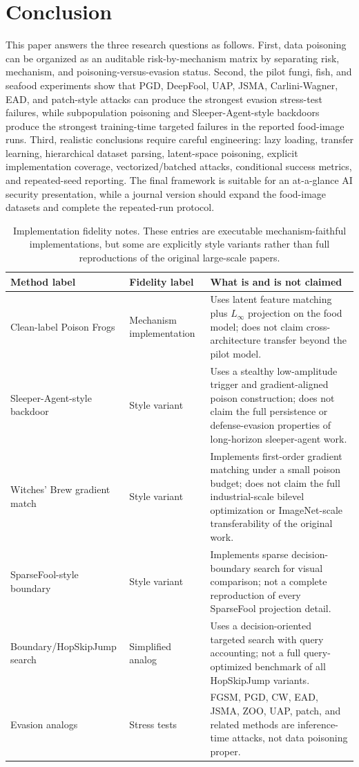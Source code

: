 \documentclass[conference]{IEEEtran}
\begin{document}
\section{Conclusion}

This paper answers the three research questions as follows. First, data poisoning can be organized as an auditable risk-by-mechanism matrix by separating risk, mechanism, and poisoning-versus-evasion status. Second, the pilot fungi, fish, and seafood experiments show that PGD, DeepFool, UAP, JSMA, Carlini-Wagner, EAD, and patch-style attacks can produce the strongest evasion stress-test failures, while subpopulation poisoning and Sleeper-Agent-style backdoors produce the strongest training-time targeted failures in the reported food-image runs. Third, realistic conclusions require careful engineering: lazy loading, transfer learning, hierarchical dataset parsing, latent-space poisoning, explicit implementation coverage, vectorized/batched attacks, conditional success metrics, and repeated-seed reporting. The final framework is suitable for an at-a-glance AI security presentation, while a journal version should expand the food-image datasets and complete the repeated-run protocol.

\begin{table}[t]
\centering
\caption{Implementation fidelity notes. These entries are executable mechanism-faithful implementations, but some are explicitly style variants rather than full reproductions of the original large-scale papers.}
\label{tab:fidelity}
\small
\begin{tabular}{p{}p{}p{}}
\toprule
Method label  & Fidelity label & What is and is not claimed \\
\midrule
Clean-label Poison Frogs & Mechanism implementation & Uses latent feature matching plus \(L_\infty\) projection on the food model; does not claim cross-architecture transfer beyond the pilot model. \\
Sleeper-Agent-style backdoor & Style variant & Uses a stealthy low-amplitude trigger and gradient-aligned poison construction; does not claim the full persistence or defense-evasion properties of long-horizon sleeper-agent work. \\
Witches' Brew gradient match & Style variant & Implements first-order gradient matching under a small poison budget; does not claim the full industrial-scale bilevel optimization or ImageNet-scale transferability of the original work. \\
SparseFool-style boundary & Style variant & Implements sparse decision-boundary search for visual comparison; not a complete reproduction of every SparseFool projection detail. \\
Boundary/HopSkipJump search & Simplified analog & Uses a decision-oriented targeted search with query accounting; not a full query-optimized benchmark of all HopSkipJump variants. \\
Evasion analogs & Stress tests & FGSM, PGD, CW, EAD, JSMA, ZOO, UAP, patch, and related methods are inference-time attacks, not data poisoning proper. \\
\bottomrule
\end{tabular}
\end{table}
\end{document}
